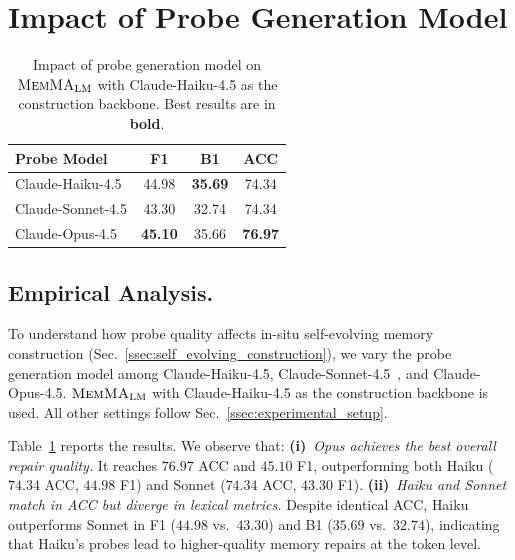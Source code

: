 

\section{Impact of Probe Generation Model}
\label{appendix:impact_probe_generation_model}

\begin{table}[t]
\centering
\small
\caption{Impact of probe generation model on $\textnormal{\textsc{MemMA}}_{\mathrm{LM}}$ with Claude-Haiku-4.5 as the construction backbone. Best results are in \textbf{bold}.}
\label{tab:probe_generation}
\begin{tabular}{lccc}
\toprule
\textbf{Probe Model} & \textbf{F1} & \textbf{B1} & \textbf{ACC} \\
\midrule
Claude-Haiku-4.5   & 44.98 & \textbf{35.69} & 74.34 \\
Claude-Sonnet-4.5  & 43.30 & 32.74 & 74.34 \\
Claude-Opus-4.5    & \textbf{45.10} & 35.66 & \textbf{76.97} \\
\bottomrule
\end{tabular}
\end{table}

\subsection{Empirical Analysis.}
To understand how probe quality affects in-situ self-evolving memory construction (Sec.~\ref{ssec:self_evolving_construction}), we vary the probe generation model among Claude-Haiku-4.5, Claude-Sonnet-4.5~\cite{anthropic2025claudesonnet45}, and Claude-Opus-4.5.
$\textnormal{\textsc{MemMA}}_{\mathrm{LM}}$ with Claude-Haiku-4.5 as the construction backbone is used. All other settings follow Sec.~\ref{ssec:experimental_setup}.

Table~\ref{tab:probe_generation} reports the results. We observe that:
\textbf{(i)}~\emph{Opus achieves the best overall repair quality.}
It reaches $76.97$ ACC and $45.10$ F1, outperforming both Haiku ($74.34$ ACC, $44.98$ F1) and Sonnet ($74.34$ ACC, $43.30$ F1).
\textbf{(ii)}~\emph{Haiku and Sonnet match in ACC but diverge in lexical metrics.}
Despite identical ACC, Haiku outperforms Sonnet in F1 ($44.98$ vs.\ $43.30$) and B1 ($35.69$ vs.\ $32.74$), indicating that Haiku's probes lead to higher-quality memory repairs at the token level.

